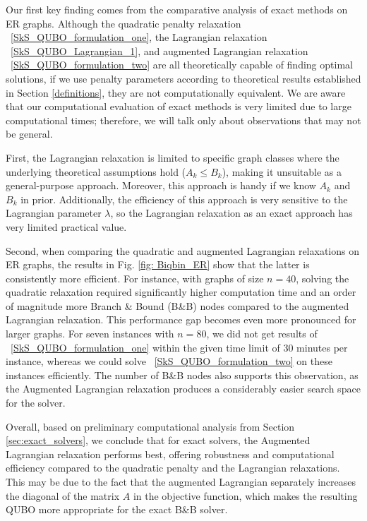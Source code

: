 \documentclass{article}
\begin{document}
Our first key finding comes from the comparative analysis of exact methods on  ER  graphs. Although the quadratic penalty relaxation ~\eqref{SkS_QUBO_formulation_one}, the Lagrangian relaxation ~\eqref{SkS_QUBO_Lagrangian_1}, and augmented Lagrangian relaxation ~\eqref{SkS_QUBO_formulation_two}  are all theoretically capable of finding optimal solutions, if we use penalty parameters according to theoretical results established in Section \ref{definitions}, 
they are not computationally equivalent. We are aware that our computational evaluation of exact methods is very limited due to large computational times; therefore, we will talk only about observations that may not be general.

First, the Lagrangian relaxation is limited to specific graph classes where the underlying theoretical assumptions hold ($A_k \le B_k$), making it unsuitable as a general-purpose approach. Moreover, this approach is handy if we know $A_k$ and $B_k$ in prior. Additionally, the efficiency of this approach is very sensitive to the Lagrangian parameter $\lambda$, so the Lagrangian relaxation as an exact approach has very limited practical value.

Second, when comparing the quadratic and augmented Lagrangian relaxations on ER graphs, the results in Fig. \ref{fig: Biqbin_ER} show that the latter is consistently more efficient. For instance, with graphs of size $n=40$, solving the quadratic relaxation required significantly higher computation time and an order of magnitude more Branch \& Bound (B\&B) nodes compared to the augmented Lagrangian relaxation. This performance gap becomes even more pronounced for larger graphs. For seven instances with $n=80$, we did not get results of ~\eqref{SkS_QUBO_formulation_one} within the given time limit of 30 minutes per instance, whereas we could solve ~\eqref{SkS_QUBO_formulation_two} on these instances efficiently. The number of B\&B nodes also supports this observation, as the Augmented Lagrangian relaxation produces a considerably easier search space for the solver.


Overall, based on preliminary computational analysis from Section \ref{sec:exact_solvers}, we conclude that for exact solvers, the Augmented Lagrangian relaxation performs best, offering robustness and computational efficiency compared to the quadratic penalty and the Lagrangian relaxations.
This may be due to the fact that the augmented Lagrangian separately increases the diagonal of the matrix $A$ in the objective function, which makes the resulting QUBO more appropriate for the exact B\&B solver. 
\end{document}
